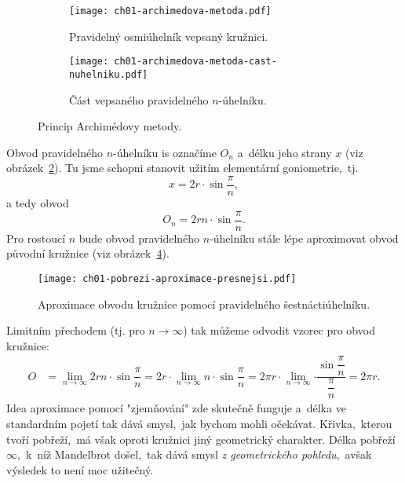 \begin{figure}[h]
    \centering
    \begin{subfigure}{\subfigwidth}
        \centering
        \texttt{[image: ch01-archimedova-metoda.pdf]}
        \caption{Pravidelný osmiúhelník vepsaný kružnici.}
        \label{subfig:archimedova_metoda}
    \end{subfigure}
    \quad
    \begin{subfigure}{\subfigwidth}
        \centering
        \texttt{[image: ch01-archimedova-metoda-cast-nuhelniku.pdf]}
        \caption{Část vepsaného pravidelného $n$-úhelníku.}
        \label{subfig:archimedova_metoda_cast_nuhelniku}
    \end{subfigure}
    \caption{Princip Archimédovy metody.}
    \label{fig:princip_archimedovy_metody}
\end{figure}
Obvod pravidelného $n$-úhelníku is označíme $O_n$ a~délku jeho strany $x$ (viz obrázek~\ref{subfig:archimedova_metoda_cast_nuhelniku}). Tu jsme schopni stanovit užitím elementární goniometrie,~tj.
\begin{equation*}
    x=2r\cdot\sin{\dfrac{\pi}{n}},
\end{equation*}
a tedy obvod
\begin{equation*}
    O_n=2rn\cdot\sin{\dfrac{\pi}{n}}.
\end{equation*}
Pro rostoucí $n$ bude obvod pravidelného $n$-úhelníku stále lépe aproximovat obvod původní kružnice (viz obrázek~\ref{fig:archimedova_metoda_presnejsi}).
\begin{figure}[h]
    \centering
    \texttt{[image: ch01-pobrezi-aproximace-presnejsi.pdf]}
    \caption{Aproximace obvodu kružnice pomocí pravidelného šestnáctiúhelníku.}
    \label{fig:archimedova_metoda_presnejsi}
\end{figure}
Limitním přechodem (tj. pro $n\to\infty$) tak můžeme odvodit vzorec pro obvod kružnice:
\begin{align*}
    O&=\lim_{n\to\infty}{2rn\cdot\sin{\dfrac{\pi}{n}}}=2r\cdot\lim_{n\to\infty}{n\cdot\sin{\dfrac{\pi}{n}}}=2\pi r\cdot\lim_{n\to\infty}{\cdot\dfrac{\sin{\dfrac{\pi}{n}}}{\dfrac{\pi}{n}}}=2\pi r.
\end{align*}
Idea aproximace pomocí "zjemňování" zde skutečně funguje a~délka ve standardním pojetí tak dává smysl,~jak bychom mohli očekávat. Křivka,~kterou tvoří pobřeží,~má však oproti kružnici jiný geometrický charakter. Délka pobřeží $\infty$,~k~níž Mandelbrot došel,~tak dává smysl \emph{z geometrického pohledu},~avšak výsledek to není moc užitečný.